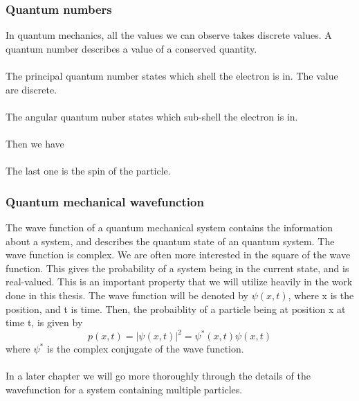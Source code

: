 \subsubsection{Quantum numbers}
In quantum mechanics, all the values we can observe takes discrete values. 
A quantum number describes a value of a conserved quantity. 
\\
\\
The principal quantum number states which shell the electron is in. The value are discrete. \\
\\
The angular quantum nuber states which sub-shell the electron is in. 
\\
\\
Then we have
\\
\\
The last one is the spin of the particle.
\subsubsection{Quantum mechanical wavefunction}
The wave function of a quantum mechanical system contains the information about a system, and describes the quantum state of an quantum system. The wave function is complex. We are often more interested in the square of the wave function. This gives the probability of a system being in the current state, and is real-valued. This is an important property that we will utilize heavily in the work done in this thesis. The wave function will be denoted by $\psi(x,t)$, where x is the position, and t is time. Then, the probaiblity of a particle being at position x at time t, is given by
\begin{equation}
    p(x,t) = |\psi(x,t)|^2 = \psi^*(x,t)\psi(x,t)
\end{equation}
where $\psi^*$ is the complex conjugate of the wave function. 
\\
\\
In a later chapter we will go more thoroughly through the details of the wavefunction for a system containing multiple particles. 

